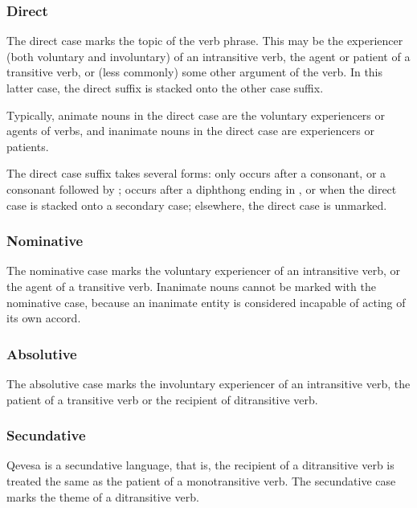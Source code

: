 \documentclass[grammar]{subfiles}
\begin{document}
\subsubsection{Direct}
\label{sssec:ns_direct_case}

The direct case marks the topic of the verb phrase.  This may be the
experiencer (both voluntary and involuntary) of an intransitive verb, the agent
or patient of a transitive verb, or (less commonly) some other argument of the
verb.  In this latter case, the direct suffix is stacked onto the other case
suffix. 

Typically, animate nouns in the direct case are the voluntary experiencers or
agents of verbs, and inanimate nouns in the direct case are experiencers or
patients. 

The direct case suffix takes several forms:  only occurs after a
consonant, or a consonant followed by ;  occurs after a diphthong
ending in , or when the direct case is stacked onto a secondary case;
elsewhere, the direct case is unmarked.


\subsubsection{Nominative}
\label{sssec:ns_nominative_case}

The nominative case marks the voluntary experiencer of an intransitive verb, or
the agent of a transitive verb.  Inanimate nouns cannot be marked with the
nominative case, because an inanimate entity is considered incapable of acting
of its own accord. 


\subsubsection{Absolutive}
\label{sssec:ns_absolutive_case}

The absolutive case marks the involuntary experiencer of an intransitive verb,
the patient of a transitive verb or the recipient of ditransitive verb.


\subsubsection{Secundative}
\label{sssec:ns_secundative_case}

Qevesa is a secundative language, that is, the recipient of a ditransitive verb
is treated the same as the patient of a monotransitive verb. The secundative
case marks the theme of a ditransitive verb.
\end{document}
